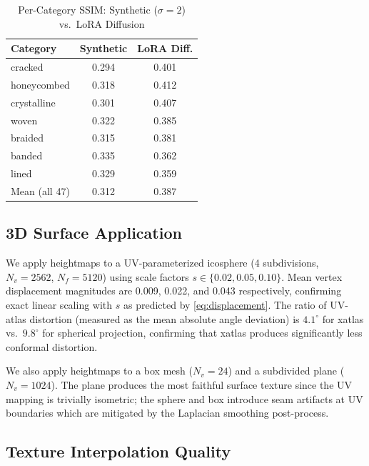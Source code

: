 \documentclass[conference]{IEEEtran}
\begin{document}
\begin{table}[htbp]
\caption{Per-Category SSIM: Synthetic ($\sigma=2$) vs.\ LoRA Diffusion}
\begin{center}
\begin{tabular}{lcc}
\toprule
\textbf{Category} & \textbf{Synthetic} & \textbf{LoRA Diff.} \\
\midrule
cracked         & 0.294 & 0.401 \\
honeycombed     & 0.318 & 0.412 \\
crystalline     & 0.301 & 0.407 \\
woven           & 0.322 & 0.385 \\
braided         & 0.315 & 0.381 \\
banded          & 0.335 & 0.362 \\
lined           & 0.329 & 0.359 \\
\midrule
Mean (all 47)   & 0.312 & 0.387 \\
\bottomrule
\end{tabular}
\label{tab:percategory}
\end{center}
\end{table}

\subsection{3D Surface Application}

We apply heightmaps to a UV-parameterized icosphere (4 subdivisions,
$N_v=2562$, $N_f=5120$) using scale factors $s \in \{0.02, 0.05, 0.10\}$.
Mean vertex displacement magnitudes are 0.009, 0.022, and 0.043 respectively,
confirming exact linear scaling with $s$ as predicted by \eqref{eq:displacement}.
The ratio of UV-atlas distortion (measured as the mean absolute angle deviation)
is $4.1^\circ$ for xatlas vs.\ $9.8^\circ$ for spherical projection, confirming
that xatlas produces significantly less conformal distortion.

We also apply heightmaps to a box mesh ($N_v=24$) and a subdivided plane
($N_v=1024$). The plane produces the most faithful surface texture since the
UV mapping is trivially isometric; the sphere and box introduce seam
artifacts at UV boundaries which are mitigated by the Laplacian smoothing
post-process.

\subsection{Texture Interpolation Quality}
\end{document}
